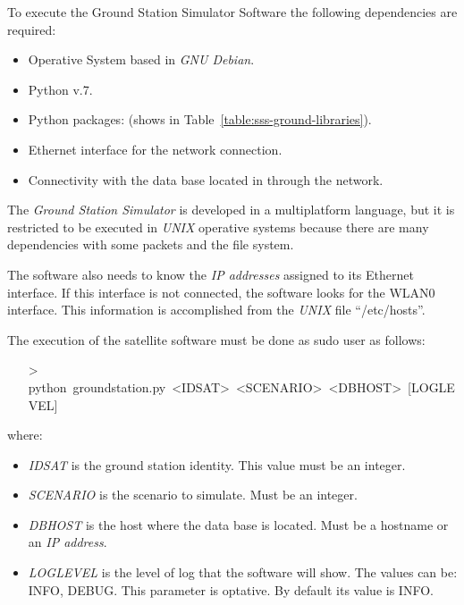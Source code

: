 To execute the Ground Station Simulator Software the following dependencies are
required:
\begin{itemize}
\item Operative System based in \emph{GNU Debian}.
\item Python v.7.
\item Python packages: (shows in Table~\ref{table:sss-ground-libraries}).
\item Ethernet interface for the network connection.
\item Connectivity with the data base located in \bonfire through the network.
\end{itemize}

The \emph{Ground Station Simulator} is developed in a multiplatform language, but it is restricted to be executed in \emph{UNIX} operative systems because there are many dependencies with some packets and the file system. 

The software also needs to know the \emph{IP addresses} assigned to its Ethernet interface. If this interface is not connected, the software looks for the WLAN0 interface. This information is accomplished from the \emph{UNIX} file ``/etc/hosts''.

The execution of the satellite software must be done as sudo user as follows:
\begin{itemize}
\item[>]python~groundstation.py~<IDSAT>~<SCENARIO>~<DBHOST>~[LOGLEVEL]
\end{itemize}

where:
\begin{itemize}
\item \emph{IDSAT} is the ground station identity. This value must be an integer. 
\item \emph{SCENARIO} is the scenario to simulate. Must be an integer.
\item \emph{DBHOST} is the host where the data base is located. Must be a hostname or an \emph{IP address}.
\item \emph{LOGLEVEL} is the level of log that the software will show. The values can be: INFO, DEBUG. This parameter is optative. By default its value is INFO. 
\end{itemize}
